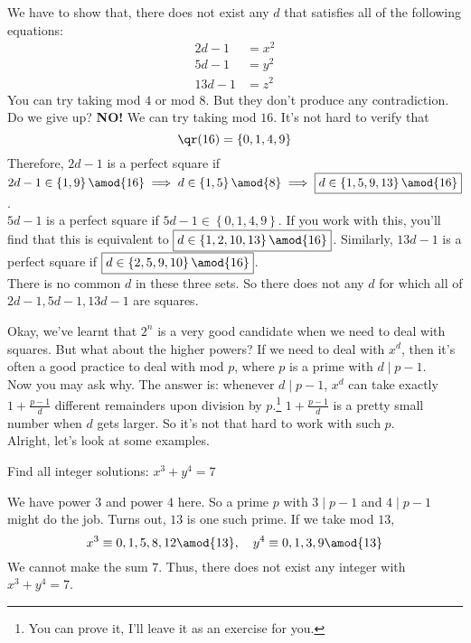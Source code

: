 \documentclass[11pt]{scrartcl}
\begin{document}
\begin{soln}
We have to show that, there does not exist any \(d\) that satisfies all of the following equations:
\begin{equation*}
\begin{split}
2d-1 &= x^2 \\
5d -1 &= y^2 \\
13d-1 &= z^2
\end{split}
\end{equation*}
You can try taking mod \(4\) or mod \(8\). But they don't produce any contradiction. Do we give up? \textbf{NO!} We can try taking mod \(16\). It's not hard to verify that
\[ \qr(16) = \left\{ 0,1,4,9 \right\}  \]
Therefore, \(2d-1\) is a perfect square if \(2d-1 \in \left\{ 1,9 \right\} \amod{16}  \implies d \in \left\{ 1,5 \right\} \amod{8} \implies \boxed{d \in \left\{ 1,5,9,13 \right\} \amod{16}}\). \\
\(5d-1\) is a perfect square if \(5d-1 \in \left\{ 0,1,4,9 \right\}\). If you work with this, you'll find that this is equivalent to \(\boxed{d \in \left\{ 1,2,10,13 \right\} \amod{16}} \). Similarly, \(13d-1\) is a perfect square if \(\boxed{d \in \left\{ 2,5,9,10 \right\} \amod{16}}\). \\
There is no common \(d\) in these three sets. So there does not any \(d\) for which all of \(2d-1, 5d-1, 13d-1\) are squares.
\end{soln}
Okay, we've learnt that \(2^n\) is a very good candidate when we need to deal with squares. But what about the higher powers? If we need to deal with \(x^d\), then it's often a good practice to deal with mod \(p\), where \(p\) is a prime with \(d \mid p-1\). \\
Now you may ask why. The answer is: whenever \(d \mid p-1\), \(x^d\) can take exactly \(1+\frac{p-1}{d}\) different remainders upon division by \(p\).\footnote{You can prove it, I'll leave it as an exercise for you.} \(1+\frac{p-1}{d}\) is a pretty small number when \(d\) gets larger. So it's not that hard to work with such \(p\). \\
Alright, let's look at some examples.
\begin{exercise}
Find all integer solutions: \(x^3+y^4=7\)
\end{exercise}
\begin{soln}
We have power \(3\) and power \(4\) here. So a prime \(p\) with \(3 \mid p-1\) and \(4 \mid p-1\) might do the job. Turns out, \(13\) is one such prime. If we take mod \(13\),
\[x^3 \equiv 0,1,5,8,12 \amod{13}, \quad y^4 \equiv 0,1,3,9 \amod{13}\]
We cannot make the sum \(7\). Thus, there does not exist any integer with \(x^3+y^4=7\).
\end{soln}
\end{document}

